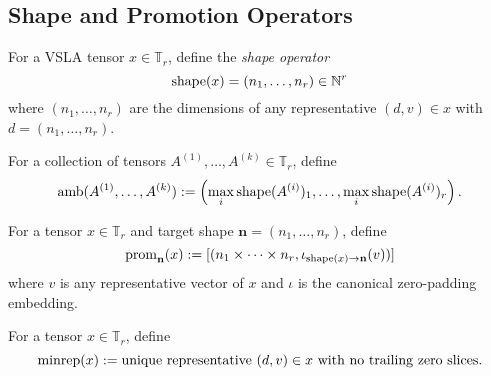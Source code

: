 \subsection{Shape and Promotion Operators}

\begin{definition}
For a VSLA tensor $x \in \mathbb{T}_r$, define the \emph{shape operator}
\[
\operatorname{shape}(x) = (n_1, \ldots, n_r) \in \mathbb{N}^r
\]
where $(n_1, \ldots, n_r)$ are the dimensions of any representative $(d, v) \in x$ with $d = (n_1, \ldots, n_r)$.
\end{definition}

\begin{definition}
For a collection of tensors $A^{(1)}, \ldots, A^{(k)} \in \mathbb{T}_r$, define
\[
\operatorname{amb}(A^{(1)}, \ldots, A^{(k)}) := \left(\max_i \operatorname{shape}(A^{(i)})_1, \ldots, \max_i \operatorname{shape}(A^{(i)})_r\right).
\]
\end{definition}

\begin{definition}
For a tensor $x \in \mathbb{T}_r$ and target shape $\mathbf{n} = (n_1, \ldots, n_r)$, define
\[
\operatorname{prom}_{\mathbf{n}}(x) := [(n_1 \times \cdots \times n_r, \iota_{\operatorname{shape}(x) \rightarrow \mathbf{n}}(v))]
\]
where $v$ is any representative vector of $x$ and $\iota$ is the canonical zero-padding embedding.
\end{definition}

\begin{definition}
For a tensor $x \in \mathbb{T}_r$, define
\[
\operatorname{minrep}(x) := \text{unique representative } (d,v) \in x \text{ with no trailing zero slices}.
\]
\end{definition}
